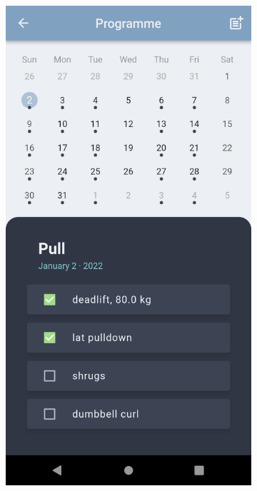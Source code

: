 \begin{figure}[h!]
  \begin{subfigure}[b]{0.21\linewidth}
    \includegraphics[width=\linewidth]{resume/imgs/yakked/mob2.png}
  \end{subfigure}
  \begin{subfigure}[b]{0.21\linewidth}

\end{subfigure}
\end{figure}
